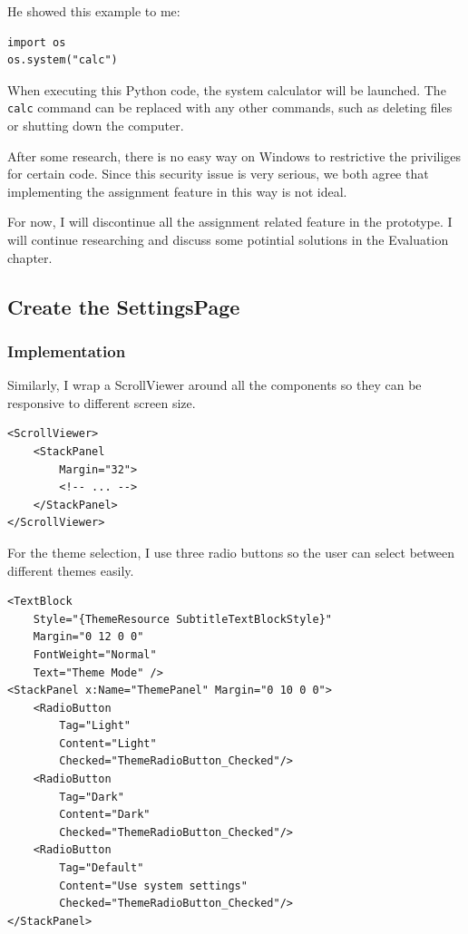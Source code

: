 \documentclass[a4paper]{report}
\newcommand{\code}{\texttt}
\begin{document}
He showed this example to me:

\begin{verbatim}
import os
os.system("calc")
\end{verbatim}

When executing this Python code, the system calculator will be launched. The \code{calc} command can be replaced with any other commands, such as deleting files or shutting down the computer.

After some research, there is no easy way on Windows to restrictive the priviliges for certain code. Since this security issue is very serious, we both agree that implementing the assignment feature in this way is not ideal.

For now, I will discontinue all the assignment related feature in the prototype. I will continue researching and discuss some potintial solutions in the Evaluation chapter.

\subsection{Create the SettingsPage}

\subsubsection{Implementation}

Similarly, I wrap a ScrollViewer around all the components so they can be responsive to different screen size.

\begin{verbatim}
<ScrollViewer>
    <StackPanel
        Margin="32">
        <!-- ... -->
    </StackPanel>
</ScrollViewer>
\end{verbatim}

For the theme selection, I use three radio buttons so the user can select between different themes easily.

\begin{verbatim}
<TextBlock
    Style="{ThemeResource SubtitleTextBlockStyle}"
    Margin="0 12 0 0"
    FontWeight="Normal"
    Text="Theme Mode" />
<StackPanel x:Name="ThemePanel" Margin="0 10 0 0">
    <RadioButton 
        Tag="Light" 
        Content="Light"
        Checked="ThemeRadioButton_Checked"/>
    <RadioButton 
        Tag="Dark" 
        Content="Dark"
        Checked="ThemeRadioButton_Checked"/>
    <RadioButton 
        Tag="Default" 
        Content="Use system settings"
        Checked="ThemeRadioButton_Checked"/>
</StackPanel>
\end{verbatim}
\end{document}
